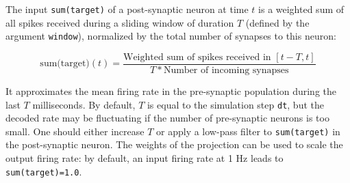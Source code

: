 \documentclass[
  11pt,
  a4paper,
]{scrbook}
\begin{document}
The input \texttt{sum(target)} of a post-synaptic neuron at time \(t\)
is a weighted sum of all spikes received during a sliding window of
duration \(T\) (defined by the argument \texttt{window}), normalized by
the total number of synapses to this neuron:

\[
\text{sum(target)}(t) = \frac{\text{Weighted sum of spikes received in } [t - T , t]}{T * \text{Number of incoming synapses}}
\]

It approximates the mean firing rate in the pre-synaptic population
during the last \(T\) milliseconds. By default, \(T\) is equal to the
simulation step \texttt{dt}, but the decoded rate may be fluctuating if
the number of pre-synaptic neurons is too small. One should either
increase \(T\) or apply a low-pass filter to \texttt{sum(target)} in the
post-synaptic neuron. The weights of the projection can be used to scale
the output firing rate: by default, an input firing rate at 1 Hz leads
to \texttt{sum(target)=1.0}.
\end{document}
